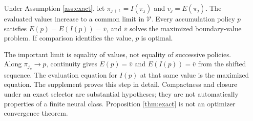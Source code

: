 \begin{proposition}
\label{thm:exact}
Under Assumption \ref{ass:exact}, let $\pi_{j+1}=I(\pi_j)$ and $v_j=E(\pi_j)$. The evaluated values increase to a common limit in $\mathcal V$. Every accumulation policy $p$ satisfies $E(p)=E(I(p))=\bar v$, and $\bar v$ solves the maximized boundary-value problem. If comparison identifies the value, $p$ is optimal.
\end{proposition}

The important limit is equality of values, not equality of successive policies. Along $\pi_{j_k}\to p$, continuity gives $E(p)=\bar v$ and $E(I(p))=\bar v$ from the shifted sequence. The evaluation equation for $I(p)$ at that same value is the maximized equation. The supplement proves this step in detail. Compactness and closure under an exact selector are substantial hypotheses; they are not automatically properties of a finite neural class. Proposition \ref{thm:exact} is not an optimizer convergence theorem.
